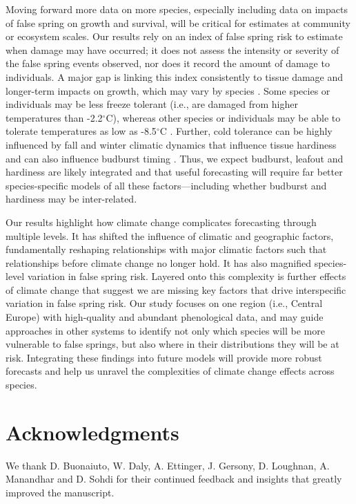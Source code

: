 \documentclass{article}\usepackage[]{graphicx}\usepackage[]{color}
\begin{document}
Moving forward more data on more species, especially including data on impacts of false spring on growth and survival, will be critical for estimates at community or ecosystem scales. Our results rely on an index of false spring risk to estimate when damage may have occurred; it does not assess the intensity or severity of the false spring events observed, nor does it record the amount of damage to individuals. A major gap is linking this index consistently to tissue damage and longer-term impacts on growth, which may vary by species \citep{Lenz2013,Korner2016,bennett2018globtherm,Zhuo2018}. Some species or individuals may be less freeze tolerant (i.e., are damaged from higher temperatures than -2.2$^{\circ}$C), whereas other species or individuals may be able to tolerate temperatures as low as -8.5$^{\circ}$C \citep{Lenz2016}. Further, cold tolerance can be highly influenced by fall and winter climatic dynamics that influence tissue hardiness \citep{Charrier2011, Vitasse2014,Hofmann2015} and can also influence budburst timing \citep{Morin2007}. Thus, we expect budburst, leafout and hardiness are likely integrated and that useful forecasting will require far better species-specific models of all these factors---including whether budburst and hardiness may be inter-related. 

Our results highlight how climate change complicates forecasting through multiple levels. It has shifted the influence of climatic and geographic factors, fundamentally reshaping relationships with major climatic factors such that relationships before climate change no longer hold. It has also magnified species-level variation in false spring risk. Layered onto this complexity is further effects of climate change that suggest we are missing key factors that drive interspecific variation in false spring risk. Our study focuses on one region (i.e., Central Europe) with high-quality and abundant phenological data, and may guide approaches in other systems to identify not only which species will be more vulnerable to false springs, but also where in their distributions they will be at risk. Integrating these findings into future models will provide more robust forecasts and help us unravel the complexities of climate change effects across species.

\section*{Acknowledgments}

We thank D. Buonaiuto, W. Daly, A. Ettinger, J. Gersony, D. Loughnan, A. Manandhar and D. Sohdi for their continued feedback and insights that greatly improved the manuscript.
\end{document}
